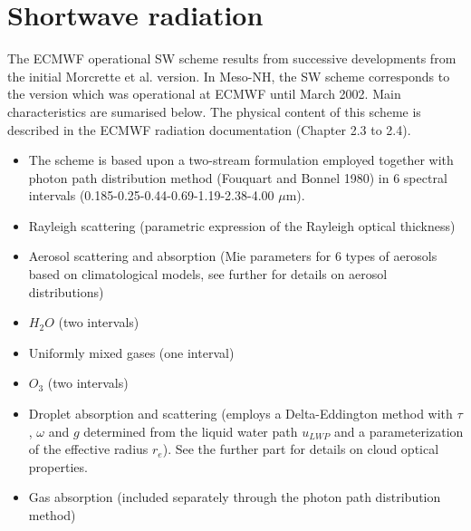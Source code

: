 \section{Shortwave radiation}

The ECMWF operational SW scheme results from successive developments from the initial Morcrette et al. version. In Meso-NH, the SW scheme corresponds to the version which was operational at ECMWF until March 2002. Main characteristics are sumarised below. The physical content of this scheme is described in the ECMWF radiation documentation (Chapter 2.3 to 2.4). 


\begin{itemize}

               \item The scheme is based upon a two-stream formulation employed together with photon path
                   distribution method (Fouquart and Bonnel 1980) in 6 spectral intervals
                   (0.185-0.25-0.44-0.69-1.19-2.38-4.00 $\mu$m).\footnotemark 
%


               \item Rayleigh scattering (parametric expression of the Rayleigh optical thickness)
               \item Aerosol scattering and absorption (Mie parameters for 6 types of aerosols based on climatological models, see further for details on aerosol distributions)
               \item $H_{2}O$ (two intervals)
               \item Uniformly mixed gases (one interval)
               \item $O_{3}$ (two intervals)
\end{itemize}



\begin{itemize}
            \item Droplet absorption and scattering (employs a Delta-Eddington
method with $\tau$, $\omega$ and $g$ determined from the liquid water path
$u_{LWP}$ and a parameterization of the effective radius $r_{e}$). See the further part for details on cloud optical properties.
            \item Gas absorption (included separately through the photon path distribution method)
\end{itemize}


